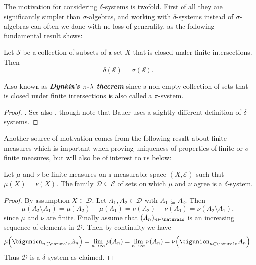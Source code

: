 \documentclass[article, a4paper, 11pt, oneside]{memoir}
\numberwithin{equation}{chapter}
\newcommand{\calE}{\mathcal{E}}
\newcommand{\calD}{\mathcal{D}}
\newcommand{\calS}{\mathcal{S}}
\newcommand{\keyword}[1]{{\itshape\bfseries #1}}
\begin{document}
The motivation for considering $\delta$-systems is twofold. First of all they are significantly simpler than $\sigma$-algebras, and working with $\delta$-systems instead of $\sigma$-algebras can often we done with no loss of generality, as the following fundamental result shows:

\begin{theorem}
    Let $\calS$ be a collection of subsets of a set $X$ that is closed under finite intersections. Then
    \begin{equation*}
        \delta(\calS) = \sigma(\calS).
    \end{equation*}
\end{theorem}
%
Also known as \keyword{Dynkin's $\pi$-$\lambda$ theorem} since a non-empty collection of sets that is closed under finite intersections is also called a $\pi$-system.

\begin{proof}
    \textcite[Theorem~1.6.2]{cohn2001}. See also \textcite[Theorem~2.3]{bauer2001}, though note that Bauer uses a slightly different definition of $\delta$-systems.
\end{proof}

Another source of motivation comes from the following result about finite measures which is important when proving uniqueness of properties of finite or $\sigma$-finite measures, but will also be of interest to us below:

\begin{lemma}
    \label{thm:finite-measures-agree-on-Dynkin}
    Let $\mu$ and $\nu$ be finite measures on a measurable space $(X,\calE)$ such that $\mu(X) = \nu(X)$. The family $\calD \subseteq \calE$ of sets on which $\mu$ and $\nu$ agree is a $\delta$-system.
\end{lemma}

\begin{proof}
    By assumption $X \in \calD$. Let $A_1, A_2 \in \calD$ with $A_1 \subseteq A_2$. Then
    \begin{equation*}
        \mu(A_2 \setminus A_1)
            = \mu(A_2) - \mu(A_1)
            = \nu(A_2) - \nu(A_1)
            = \nu(A_2 \setminus A_1),
    \end{equation*}
    since $\mu$ and $\nu$ are finite. Finally assume that $(A_n)_{n\in\naturals}$ is an increasing sequence of elements in $\calD$. Then by continuity we have
    \begin{equation*}
        \mu \Bigl( \bigunion_{n\in\naturals} A_n \Bigr)
            = \lim_{n\to\infty} \mu(A_n)
            = \lim_{n\to\infty} \nu(A_n)
            = \nu \Bigl( \bigunion_{n\in\naturals} A_n \Bigr).
    \end{equation*}
    Thus $\calD$ is a $\delta$-system as claimed.
\end{proof}
\end{document}
